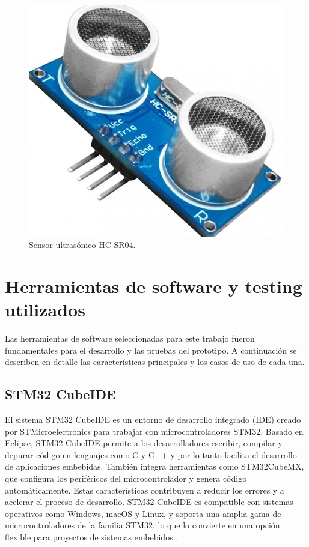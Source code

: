\begin{figure}[htbp]
	\centering
	\includegraphics[width=.5\textwidth]{./Figures/hcsr04.png}
	\caption{Sensor ultrasónico HC-SR04\protect\footnotemark.}
	\label{fig:hcsr2024}
\end{figure}


\section{Herramientas de software y testing utilizados}

Las herramientas de software seleccionadas para este trabajo fueron fundamentales para el desarrollo y las pruebas del prototipo. A continuación se describen en detalle las características principales y los casos de uso de cada una.

\subsection{STM32 CubeIDE}
\label{subsec:stm32}

El sistema STM32 CubeIDE es un entorno de desarrollo integrado (IDE) creado por STMicroelectronics para trabajar con microcontroladores STM32. Basado en Eclipse, STM32 CubeIDE permite a los desarrolladores escribir, compilar y depurar código en lenguajes como C y C++ y por lo tanto facilita el desarrollo de aplicaciones embebidas. También integra herramientas como STM32CubeMX, que configura los periféricos del microcontrolador y genera código automáticamente. Estas  características contribuyen a reducir los errores y a acelerar el proceso de desarrollo. STM32 CubeIDE es compatible con sistemas operativos como Windows, macOS y Linux, y soporta una amplia gama de microcontroladores de la familia STM32, lo que lo convierte en una opción flexible para proyectos de sistemas embebidos \citep{WEBSITE:stm32}.

